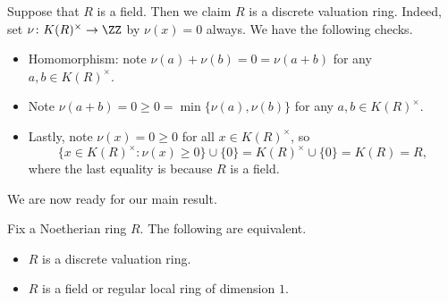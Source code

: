 \documentclass[../notes.tex]{subfiles}
\begin{document}
\begin{example} \label{ex:fieldisdvr}
	Suppose that $R$ is a field. Then we claim $R$ is a discrete valuation ring. Indeed, set $\nu\colon K(R)^\times\to\ZZ$ by $\nu(x)=0$ always. We have the following checks.
	\begin{itemize}
		\item Homomorphism: note $\nu(a)+\nu(b)=0=\nu(a+b)$ for any $a,b\in K(R)^\times$.
		\item Note $\nu(a+b)=0\ge0=\min\{\nu(a),\nu(b)\}$ for any $a,b\in K(R)^\times$.
		\item Lastly, note $\nu(x)=0\ge0$ for all $x\in K(R)^\times$, so
		\[\{x\in K(R)^\times:\nu(x)\ge0\}\cup\{0\}=K(R)^\times\cup\{0\}=K(R)=R,\]
		where the last equality is because $R$ is a field.
	\end{itemize}
\end{example}
We are now ready for our main result.
\begin{proposition} \label{prop:dvrgrabbag}
	Fix a Noetherian ring $R$. The following are equivalent.
	\begin{itemize}
		\item $R$ is a discrete valuation ring.
		\item $R$ is a field or regular local ring of dimension $1$.
	\end{itemize}
\end{proposition}
\end{document}
